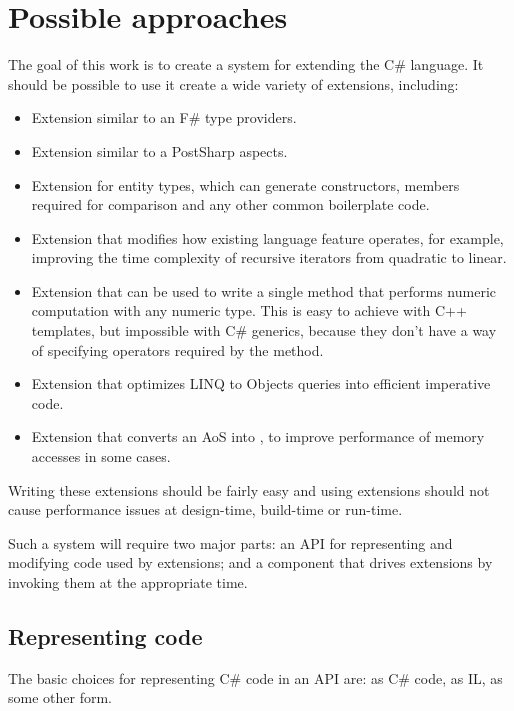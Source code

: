 \chapter{Possible approaches}

The goal of this work is to create a system for extending the C\# language. It should be possible to use it create a wide variety of extensions, including:

\begin{itemize}
\item Extension similar to an F\# type providers.
\item Extension similar to a PostSharp aspects.
\item Extension for entity types, which can generate constructors, members required for comparison and any other common boilerplate code.
\item Extension that modifies how existing language feature operates, for example, improving the time complexity of recursive iterators from quadratic to linear.
\item Extension that can be used to write a single method that performs numeric computation with any numeric type. This is easy to achieve with C++ templates, but impossible with C\# generics, because they don't have a way of specifying operators required by the method.
\item Extension that optimizes LINQ to Objects queries into efficient imperative code.
\item Extension that converts an \ac{AoS} into , to improve performance of memory accesses in some cases.
\end{itemize}


Writing these extensions should be fairly easy and using extensions should not cause performance issues at design-time, build-time or run-time.

\medskip

Such a system will require two major parts: an \ac{API} for representing and modifying code used by extensions; and a component that drives extensions by invoking them at the appropriate time.

\section{Representing code}

The basic choices for representing C\# code in an \ac{API} are: as C\# code, as \ac{IL}, as some other form.

